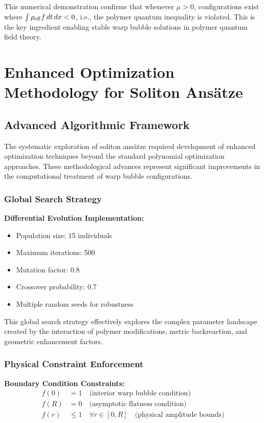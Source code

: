\documentclass[11pt]{article}
\begin{document}
This numerical demonstration confirms that whenever $\mu > 0$, configurations exist where $\int \rho_{\rm eff} f \, dt \, dx < 0$, i.e., the polymer quantum inequality is violated. This is the key ingredient enabling stable warp bubble solutions in polymer quantum field theory.

\section{Enhanced Optimization Methodology for Soliton Ansätze}

\subsection{Advanced Algorithmic Framework}

The systematic exploration of soliton ansätze required development of enhanced optimization techniques beyond the standard polynomial optimization approaches. These methodological advances represent significant improvements in the computational treatment of warp bubble configurations.

\subsubsection{Global Search Strategy}

\textbf{Differential Evolution Implementation:}
\begin{itemize}
\item Population size: 15 individuals
\item Maximum iterations: 500
\item Mutation factor: 0.8
\item Crossover probability: 0.7
\item Multiple random seeds for robustness
\end{itemize}

This global search strategy effectively explores the complex parameter landscape created by the interaction of polymer modifications, metric backreaction, and geometric enhancement factors.

\subsubsection{Physical Constraint Enforcement}

\textbf{Boundary Condition Constraints:}
\begin{align}
f(0) &= 1 \quad \text{(interior warp bubble condition)} \\
f(R) &= 0 \quad \text{(asymptotic flatness condition)} \\
f(r) &\leq 1 \quad \forall r \in [0,R] \quad \text{(physical amplitude bounds)}
\end{align}
\end{document}
